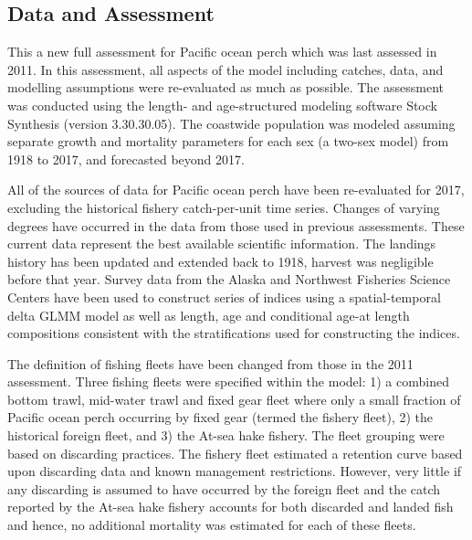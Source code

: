 \documentclass[12pt,]{article}
\begin{document}
\FloatBarrier

\subsection*{Data and Assessment}\label{data-and-assessment}

This a new full assessment for Pacific ocean perch which was last
assessed in 2011. In this assessment, all aspects of the model including
catches, data, and modelling assumptions were re-evaluated as much as
possible. The assessment was conducted using the length- and
age-structured modeling software Stock Synthesis (version 3.30.30.05).
The coastwide population was modeled assuming separate growth and
mortality parameters for each sex (a two-sex model) from 1918 to 2017,
and forecasted beyond 2017.

All of the sources of data for Pacific ocean perch have been
re-evaluated for 2017, excluding the historical fishery catch-per-unit
time series. Changes of varying degrees have occurred in the data from
those used in previous assessments. These current data represent the
best available scientific information. The landings history has been
updated and extended back to 1918, harvest was negligible before that
year. Survey data from the Alaska and Northwest Fisheries Science
Centers have been used to construct series of indices using a
spatial-temporal delta GLMM model as well as length, age and conditional
age-at length compositions consistent with the stratifications used for
constructing the indices.

The definition of fishing fleets have been changed from those in the
2011 assessment. Three fishing fleets were specified within the model:
1) a combined bottom trawl, mid-water trawl and fixed gear fleet where
only a small fraction of Pacific ocean perch occurring by fixed gear
(termed the fishery fleet), 2) the historical foreign fleet, and 3) the
At-sea hake fishery. The fleet grouping were based on discarding
practices. The fishery fleet estimated a retention curve based upon
discarding data and known management restrictions. However, very little
if any discarding is assumed to have occurred by the foreign fleet and
the catch reported by the At-sea hake fishery accounts for both
discarded and landed fish and hence, no additional mortality was
estimated for each of these fleets.
\end{document}
